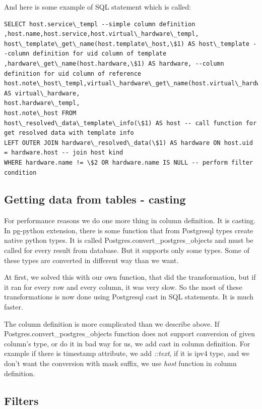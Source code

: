 \documentclass[deska]{subfiles}
\begin{document}
And here is some example of SQL statement which is called:
\begin{verbatim}
SELECT host.service\_templ --simple column definition
,host.name,host.service,host.virtual\_hardware\_templ,
host\_template\_get\_name(host.template\_host,\$1) AS host\_template --column definition for uid column of template
,hardware\_get\_name(host.hardware,\$1) AS hardware, --column definition for uid column of reference
host.note\_host\_templ,virtual\_hardware\_get\_name(host.virtual\_hardware,\$1) AS virtual\_hardware,
host.hardware\_templ,
host.note\_host FROM
host\_resolved\_data\_template\_info(\$1) AS host -- call function for get resolved data with template info
LEFT OUTER JOIN hardware\_resolved\_data(\$1) AS hardware ON host.uid = hardware.host -- join host kind
WHERE hardware.name != \$2 OR hardware.name IS NULL -- perform filter condition
\end{verbatim}

\subsection{Getting data from tables - casting}
\label{sec:cast}
For performance reasons we do one more thing in column definition. It is casting.
In pg-python extension, there is some function that from Postgresql types create native python types.
It is called Postgres.convert\_postgres\_objects
and must be called for every result from database. But it supports only some types.
Some of these types are converted in different way than we want.

At first, we solved this with our own function, that did the transformation, but if it ran for every
row and every column, it was very slow. So the most of these transformations is now done using Postgresql cast
in SQL statements. It is much faster.

The column definition is more complicated than we describe above. If
Postgres.convert\_postgres\_objects function 
does not support conversion of given column's type, or do it in bad way for us, we add cast in column definition.
For example if there is timestamp attribute, we add {\em ::text}, if it is ipv4 type, and we don't want
the conversion with mask suffix, we use {\em host} function in column definition.


\subsection{Filters}
\end{document}
